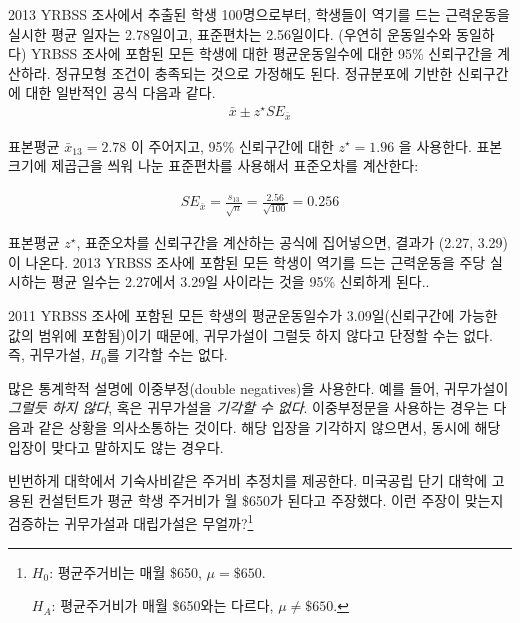 \begin{example}{2013 YRBSS 조사에서 추출된 학생 100명으로부터,
학생들이 역기를 드는 근력운동을 실시한 평균 일자는 2.78일이고, 표준편차는 2.56일이다. (우연히 운동일수와 동일하다)
YRBSS 조사에 포함된 모든 학생에 대한 평균운동일수에 대한 95\% 신뢰구간을 계산하라.
정규모형 조건이 충족되는 것으로 가정해도 된다.}
정규분포에 기반한 신뢰구간에 대한 일반적인 공식 다음과 같다.
\begin{align*}
\bar{x} \pm z^{\star} SE_{\bar{x}}
\end{align*}

표본평균 $\bar{x}_{13} = 2.78$ 이 주어지고, 95\% 신뢰구간에 대한 $z^{\star} = 1.96$ 을 사용한다.
표본크기에 제곱근을 씌워 나눈 표준편차를 사용해서 표준오차를 계산한다:

\begin{align*}
SE_{\bar{x}} = \frac{s_{13}}{\sqrt{n}} = \frac{2.56}{\sqrt{100}} = 0.256
\end{align*}

표본평균 $z^{\star}$, 표준오차를 신뢰구간을 계산하는 공식에 집어넣으면, 결과가 (2.27, 3.29)이 나온다.
2013 YRBSS 조사에 포함된 모든 학생이 역기를 드는 근력운동을 주당 실시하는 평균 일수는 2.27에서 3.29일 사이라는 것을
95\% 신뢰하게 된다..
\end{example}

2011 YRBSS 조사에 포함된 모든 학생의 평균운동일수가 3.09일(신뢰구간에 가능한 값의 범위에 포함됨)이기 때문에,
귀무가설이 그럴듯 하지 않다고 단정할 수는 없다. 즉, 귀무가설, $H_0$를 기각할 수는 없다.

\begin{tipBox}{
많은 통계학적 설명에 이중부정(double negatives)을 사용한다.
예를 들어, 귀무가설이 \emph{그럴듯 하지 않다}, 혹은 귀무가설을 \emph{기각할 수 없다}.
이중부정문을 사용하는 경우는 다음과 같은 상황을 의사소통하는 것이다. 해당 입장을 기각하지 않으면서, 동시에 해당 입장이 맞다고 말하지도 않는 경우다.}
\end{tipBox}

\begin{exercise} \label{htForHousingExpenseForCommunityCollege650}
빈번하게 대학에서 기숙사비같은 주거비 추정치를 제공한다.
미국공립 단기 대학에 고용된 컨설턴트가 평균 학생 주거비가 월 \$650가 된다고 주장했다.
이런 주장이 맞는지 검증하는 귀무가설과 대립가설은 무얼까?\footnote{
$H_0$: 평균주거비는 매월 \$650, $\mu = \$650$.

\hspace{3.4mm}$H_A$: 평균주거비가 매월 \$650와는 다르다, $\mu \neq \$650$.}
\end{exercise}

